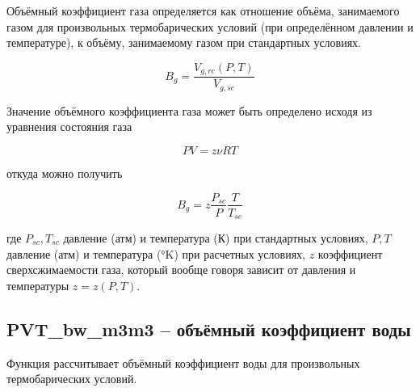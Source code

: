 Объёмный коэффициент газа определяется как отношение объёма, занимаемого газом для произвольных термобарических условий (при определённом давлении и температуре), к объёму, занимаемому газом при стандартных условиях. 

$$B_g = \frac{V_{g,rc}(P,T)}{V_{g,sc}}$$

Значение объёмного коэффициента газа может быть определено исходя из уравнения состояния газа

$$ PV = z \nu RT  $$

откуда можно получить 

$$ B_g = z \frac{P_{sc}}{P} \frac{T}{T_{sc}} $$

где $P_{sc}, T_{sc}$ давление (атм) и температура (К) при стандартных условиях, $P,T$ давление (атм) и температура (°K) при расчетных условиях, $z$ коэффициент сверхсжимаемости газа, который вообще говоря зависит от давления и температуры $z = z(P,T)$. 


\newcommand{\DataFile}{data/Bg_P_data.txt}

\subsection{PVT\_bw\_m3m3 – объёмный коэффициент воды}
Функция рассчитывает объёмный коэффициент воды для произвольных термобарических условий. 

